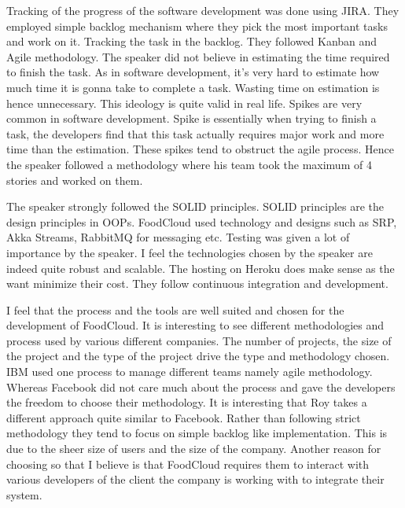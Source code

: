 Tracking of the progress of the software development was done using JIRA. They employed simple backlog mechanism where they pick the most important tasks and work on it. Tracking the task in the backlog. They followed Kanban and Agile methodology. The speaker did not believe in estimating the time required to finish the task. As in software development, it's very hard to estimate how much time it is gonna take to complete a task. Wasting time on estimation is hence unnecessary. This ideology is quite valid in real life. Spikes are very common in software development. Spike is essentially when trying to finish a task, the developers find that this task actually requires major work and more time than the estimation. These spikes tend to obstruct the agile process. Hence the speaker followed a methodology where his team took the maximum of 4 stories and worked on them. 

The speaker strongly followed the SOLID principles. SOLID principles are the design principles in OOPs. FoodCloud used technology and designs such as SRP, Akka Streams, RabbitMQ for messaging etc. Testing was given a lot of importance by the speaker. I feel the technologies chosen by the speaker are indeed quite robust and scalable. The hosting on Heroku does make sense as the want minimize their cost. They follow continuous integration and development. 

I feel that the process and the tools are well suited and chosen for the development of FoodCloud. It is interesting to see different methodologies and process used by various different companies. The number of projects, the size of the project and the type of the project drive the type and methodology chosen. IBM used one process to manage different teams namely agile methodology. Whereas Facebook did not care much about the process and gave the developers the freedom to choose their methodology. It is interesting that Roy takes a different approach quite similar to Facebook. Rather than following strict methodology they tend to focus on simple backlog like implementation. This is due to the sheer size of users and the size of the company. Another reason for choosing so that I believe is that FoodCloud requires them to interact with various developers of the client the company is working with to integrate their system.

